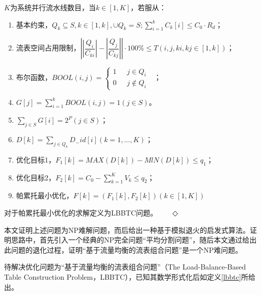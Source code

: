 \begin{definition}[LBBTC]
	\label{lbbtc}
	$K$为系统并行流水线数目，当$k\in [1,K]$，若服从：
	\begin{enumerate}
		\item 基本约束，$Q_{k}\subseteq S, k\in \left[ 1,k\right],\cup Q_{k}=S;\sum ^{k}_{i=1}C_{k}\left[ i\right] \leq C_{0}\cdot R_{d} $；
		\item 流表空间占用限制，$\left| \left| \dfrac {Q_{i}}{C_{ki}}\right| -\left| \dfrac {Q_{j}}{C_{kj}}\right| \right|\cdot 100\%\leq T\left( i, j, ki, kj\in \left[ 1,k\right] \right) $；
		\item 布尔函数，$ BOOL\left(i,j\right)=
		\begin{cases}
		1& \text{ $j \in Q_i$ }\\
		0& \text{ $j \notin Q_i$}
		\end{cases}$；
		\item $G\left[ j\right] =\sum ^{k}_{i=1}BOOL\left( i,j\right) =1\left( j\in S\right)  $。
		\item $\sum _{j\in S}G\left[ i\right] =2^{P}\left( j\in S\right)  $；
		\item $D\left[ k\right] =\sum _{j\in Q_{k}}D_{-}id\left[ i\right] \left( k=1,\ldots ,K\right)  $；
		\item 优化目标1，$ F_{1}\left[ k\right] =MAX\left( D\left[ k\right] \right) -MlN\left( D\left[ k\right] \right) \leq q_1$；
		\item 优化目标2，$ F_{2}\left[ k\right] =C_{0}-\sum ^{K}_{k=1}V_{k}\leq q_{2}$；
		\item 帕累托最小优化，$ F\left[ k\right] =\left( F_{1}\left[ k\right] ,F_{2}\left[ k\right] \right) \left( k\in \left[ 1,K\right] \right)  $
	\end{enumerate}
	对于帕累托最小优化的求解定义为LBBTC问题。 \qquad \qquad \qquad \qquad \qquad \qquad \qquad \ \ \  $\Diamond$
\end{definition}

\label{chap4nphard}
本文证明上述问题为NP难解问题，而后给出一种基于模拟退火的启发式算法。证明思路中，首先引入一个经典的NP完全问题“平均分割问题”，随后本文通过给出此问题的退化过程，证明“基于流量均衡的流表组合问题”是一个NP难问题。



待解决优化问题为“基于流量均衡的流表组合问题”（The Load-Balance-Based Table Construction Problem，LBBTC），已知其数学形式化后如定义\ref{lbbtc}所给出。





